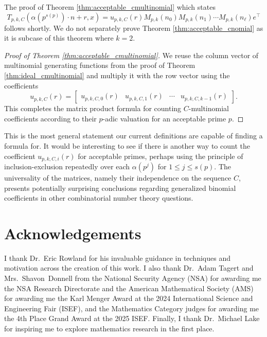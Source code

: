 \documentclass{amsart}
\theoremstyle{definition}
\begin{document}
The proof of Theorem \ref{thm:acceptable_cmultinomial} which states \[
T_{p,k,C}(\alpha(p^{s(p)}) \cdot n + r, x)
= u_{p,k,C}(r) M_{p,k}(n_0) M_{p,k}(n_1) \cdots M_{p,k}(n_\ell) e^\intercal
\] follows shortly. We do not separately prove Theorem \ref{thm:acceptable_cnomial} as it is subcase of this theorem where $k=2$.

\begin{proof}[Proof of Theorem \ref{thm:acceptable_cmultinomial}]
We reuse the column vector of multinomial generating functions from the proof of Theorem \ref{thm:ideal_cmultinomial} and multiply it with the row vector using the coefficients $$u_{p,k,C}(r)=\begin{bmatrix}
    u_{p,k,C,0}(r)&u_{p,k,C,1}(r) & \cdots & u_{p,k,C,k-1}(r)
\end{bmatrix}.$$ This completes the matrix product formula for counting $C$-multinomial coefficients according to their $p$-adic valuation for an acceptable prime $p$. 
\end{proof}
This is the most general statement our current definitions are capable of finding a formula for. It would be interesting to see if there is another way to count the coefficient $u_{p,k,C,i}(r)$ for acceptable primes, perhaps using the principle of inclusion-exclusion repeatedly over each $\alpha(p^j)$ for $1 \leq j \leq s(p)$. The universality of the matrices, namely their independence on the sequence $C$, presents potentially surprising conclusions regarding generalized binomial coefficients in other combinatorial number theory questions.

\section*{Acknowledgements}
I thank Dr.~Eric Rowland for his invaluable guidance in techniques and motivation across the creation of this work. I also thank Dr.~Adam Tagert and Mrs.~Shavon~Donnell from the National Security Agency (NSA) for awarding me the NSA Research Directorate and the American Mathematical Society (AMS) for awarding me the Karl Menger Award at the 2024 International Science and Engineering Fair (ISEF), and the Mathematics Category judges for awarding me the 4th Place Grand Award at the 2025 ISEF. Finally, I thank Dr.~Michael Lake for inspiring me to explore mathematics research in the first place.
\end{document}

